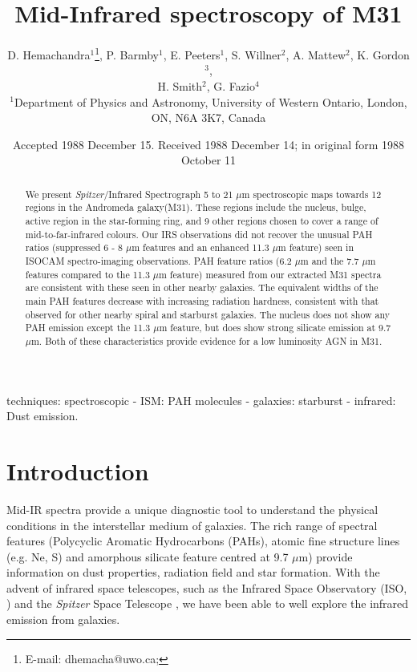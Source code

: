 \documentclass[useAMS,usenatbib,a4paper]{mn2e}
\title[Mid-Infrared spectroscopy of M31]{Mid-Infrared spectroscopy of M31}
\author[D. Hemachandra et al.]{D. Hemachandra$^{1}$\thanks{E-mail:
dhemacha@uwo.ca; }, P. Barmby$^{1}$, E. Peeters$^{1}$, S. Willner$^{2}$, A. Mattew$^{2}$, K. Gordon$^{3}$, \\ H. Smith$^{2}$, G. Fazio$^{4}$ \\
$^{1}$Department of Physics and Astronomy, University of Western Ontario, London, ON, N6A 3K7, Canada\\
}
\begin{document}
\date{Accepted 1988 December 15. Received 1988 December 14; in original form 1988 October 11}

\pagerange{\pageref{firstpage}--\pageref{lastpage}} 

\maketitle

\label{firstpage}

\begin{abstract}
We present {\sl Spitzer}/Infrared Spectrograph 5 to 21 $\mu$m spectroscopic maps towards 12 regions in the Andromeda galaxy(M31). These regions include the nucleus, bulge, active region in the star-forming ring, and 9 other regions chosen to cover a range of mid-to-far-infrared colours. Our IRS observations did not recover the unusual PAH ratios (suppressed 6 - 8 $\mu$m features and an enhanced 11.3 $\mu$m feature) seen in ISOCAM spectro-imaging observations. PAH feature ratios (6.2 $\mu$m and the 7.7 $\mu$m features compared to the 11.3 $\mu$m feature) measured from our extracted M31 spectra are consistent with these seen in other nearby galaxies. The equivalent widths of the main PAH features decrease with increasing radiation hardness, consistent with that observed for other nearby spiral and starburst galaxies. The nucleus does not show any PAH emission except the 11.3 $\mu$m feature, but does show strong silicate emission at 9.7 $\mu$m. Both of these characteristics provide evidence for a low luminosity AGN in M31.
\end{abstract}

\begin{keywords}
techniques: spectroscopic - ISM: PAH molecules - galaxies: starburst - infrared: Dust emission.
\end{keywords}

\section{Introduction}

Mid-IR spectra provide a unique diagnostic tool to understand the physical conditions in the interstellar medium of galaxies. The rich range of spectral features (Polycyclic Aromatic Hydrocarbons (PAHs), atomic fine structure lines (e.g. Ne, S) and amorphous silicate feature centred at 9.7 $\mu$m) provide information on dust properties, radiation field and star formation. With the advent of infrared space telescopes, such as the Infrared Space Observatory (ISO, \citealt{Kessler1996}) and the {\em Spitzer} Space Telescope \citep{spitzer2004}, we have been able to well explore the infrared emission from galaxies. 
\end{document}
